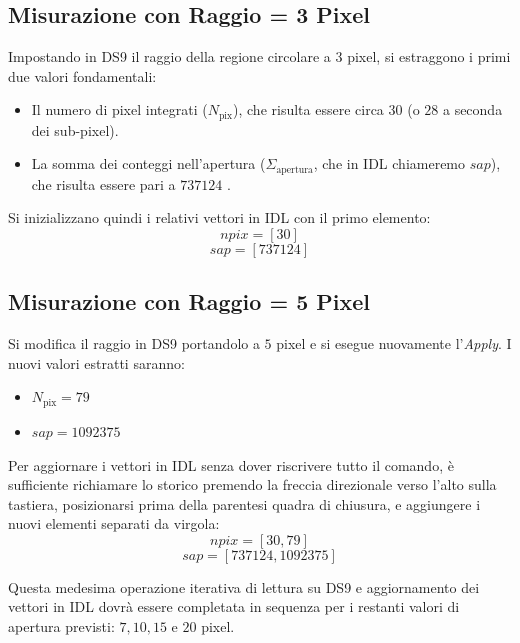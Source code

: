 \subsection{Misurazione con Raggio = 3 Pixel}
Impostando in DS9 il raggio della regione circolare a $3$ pixel, si estraggono i primi due valori fondamentali:
\begin{itemize}
\item Il numero di pixel integrati ($N_{\text{pix}}$), che risulta essere circa $30$ (o $28$ a seconda dei sub-pixel).
\item La somma dei conteggi nell'apertura ($\Sigma_{\text{apertura}}$, che in IDL chiameremo $sap$), che risulta essere pari a $737124$ .
\end{itemize}
Si inizializzano quindi i relativi vettori in IDL con il primo elemento:
\begin{equation}
npix = [30]
\end{equation}
\begin{equation}
sap = [737124]
\end{equation}

\subsection{Misurazione con Raggio = 5 Pixel}
Si modifica il raggio in DS9 portandolo a $5$ pixel e si esegue nuovamente l'\textit{Apply}. I nuovi valori estratti saranno:
\begin{itemize}
\item $N_{\text{pix}} = 79$
\item $sap = 1092375$ 
\end{itemize}
Per aggiornare i vettori in IDL senza dover riscrivere tutto il comando, è sufficiente richiamare lo storico premendo la freccia direzionale verso l'alto sulla tastiera, posizionarsi prima della parentesi quadra di chiusura, e aggiungere i nuovi elementi separati da virgola:
\begin{equation}
npix = [30, 79]
\end{equation}
\begin{equation}
sap = [737124, 1092375]
\end{equation}

Questa medesima operazione iterativa di lettura su DS9 e aggiornamento dei vettori in IDL dovrà essere completata in sequenza per i restanti valori di apertura previsti: $7, 10, 15$ e $20$ pixel.